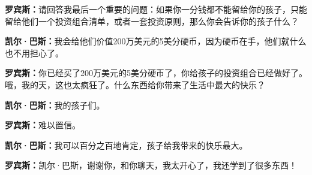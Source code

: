 \begin{BookQuote}
\textbf{罗宾斯：}请回答我最后一个重要的问题：如果你一分钱都不能留给你的孩子，只能留给他们一个投资组合清单，或者一套投资原则，那么你会告诉你的孩子什么？
\end{BookQuote}

\begin{BookQuote}
\textbf{凯尔·巴斯：}我会给他们价值200万美元的5美分硬币，因为硬币在手，他们就什么也不用担心了。
\end{BookQuote}

\begin{BookQuote}
\textbf{罗宾斯：}你已经买了200万美元的5美分硬币了，你给孩子的投资组合已经做好了。哦，我的天，这也太疯狂了。什么东西给你带来了生活中最大的快乐？
\end{BookQuote}

\begin{BookQuote}
\textbf{凯尔·巴斯：}我的孩子们。
\end{BookQuote}

\begin{BookQuote}
\textbf{罗宾斯：}难以置信。
\end{BookQuote}

\begin{BookQuote}
\textbf{凯尔·巴斯：}我可以百分之百地肯定，孩子给我带来的快乐最大。
\end{BookQuote}

\begin{BookQuote}
\textbf{罗宾斯：}凯尔·巴斯，谢谢你，和你聊天，我太开心了，我还学到了很多东西！
\end{BookQuote}
